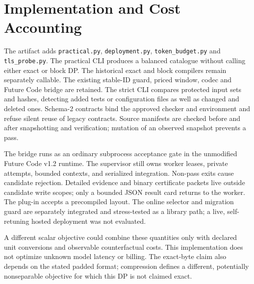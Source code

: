 \section{Implementation and Cost Accounting}\label{sec:impl}
The artifact adds \texttt{practical.py}, \texttt{deployment.py},
\texttt{token\_budget.py} and \texttt{tls\_probe.py}. The practical CLI produces
a balanced catalogue without calling either exact or block DP. The historical
exact and block compilers remain separately callable. The existing stable-ID
guard, priced window, codec and Future Code bridge are retained. The strict CLI
compares protected input sets and hashes, detecting added tests or configuration
files as well as changed and deleted ones. Schema-2 contracts bind the approved
checker and environment and refuse silent reuse of legacy contracts. Source
manifests are checked before and after snapshotting and verification; mutation
of an observed snapshot prevents a pass.

The bridge runs as an ordinary subprocess acceptance gate in the unmodified
Future Code v1.2 runtime. The supervisor still owns worker leases, private
attempts, bounded contexts, and serialized integration. Non-pass exits cause
candidate rejection. Detailed evidence and binary certificate packets live
outside candidate write scopes; only a bounded JSON result card returns to the
worker. The plug-in accepts a precompiled layout. The online selector and
migration guard are separately integrated and stress-tested as a library path; a
live, self-retuning hosted deployment was not evaluated.

A different scalar objective could combine these quantities only with declared
unit conversions and observable counterfactual costs. This implementation does
not optimize unknown model latency or billing. The exact-byte claim also depends
on the stated padded format; compression defines a different, potentially
nonseparable objective for which this DP is not claimed exact.

